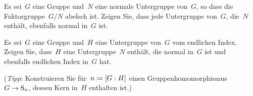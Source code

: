 \documentclass{scrartcl}
\begin{document}
\begin{exercise}
  Es sei~$G$ eine Gruppe und~$N$ eine normale Untergruppe von~$G$, so dass die Faktorgruppe~$G/N$ abelsch ist.
  Zeigen Sie, dass jede Untergruppe von~$G$, die~$N$ enthält, ebenfalls normal in~$G$ ist.
\end{exercise}

\begin{exercise}
  Es sei~$G$ eine Gruppe und~$H$ eine Untergruppe von~$G$ vom endlichen Index.
  Zeigen Sie, dass~$H$ eine Untergruppe~$N$ enthält, die normal in~$G$ ist und ebenfalls endlichen Index in~$G$ hat.

  (\emph{Tipp}: Konstruieren Sie für~$n \coloneqq [G : H]$ einen Gruppenhomomorphismus~$G \to \Sym_n$, dessen Kern in~$H$ enthalten ist.)
\end{exercise}

\end{document}
